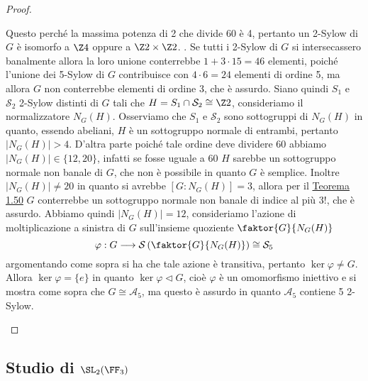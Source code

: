 \documentclass[11pt]{scrartcl}
\begin{document}
\begin{proof}
\begin{itemize}
{				Questo perché la massima potenza di 2 che divide 60 è 4, pertanto
				un 2-Sylow di $G$ è isomorfo a $\Z4$ oppure a $\Z2\times \Z2$.
			}. Se tutti i 2-Sylow di $G$ si intersecassero banalmente allora la 
			loro unione conterrebbe $1 + 3\cdot 15 = 46$ elementi, poiché l'unione dei
			5-Sylow di $G$ contribuisce con $4\cdot 6 = 24$ elementi di ordine 5,
			ma allora $G$ non conterrebbe elementi di ordine 3, che è assurdo.
			Siano quindi $S_1$ e $\mathcal{S}_2$ 2-Sylow distinti di $G$ tali che 
			$H = S_1\cap \mathcal{S}_2 \cong \Z2$, consideriamo il normalizzatore $N_G(H)$.
			Osserviamo che $S_1$ e $\mathcal{S}_2$ sono sottogruppi di $N_G(H)$ in quanto, essendo
			abeliani, $H$ è un sottogruppo normale di entrambi, pertanto $|N_G(H)| > 4$.
			D'altra parte poiché tale ordine deve dividere 60 abbiamo 
			$|N_G(H)| \in \{12, 20\}$, infatti se fosse uguale a 60 $H$ sarebbe un 
			sottogruppo normale non banale di $G$, che non è possibile in quanto $G$
			è semplice. Inoltre $|N_G(H)| \neq 20$ in quanto si avrebbe $[G:N_G(H)] = 3$,
			allora per il \hyperref[teorema1.50]{Teorema 1.50} $G$ conterrebbe
			un sottogruppo normale non banale di indice al più $3!$, che è assurdo.
			Abbiamo quindi $|N_G(H)| = 12$, consideriamo l'azione di 
			moltiplicazione a sinistra di $G$ sull'insieme quoziente $\faktor{G}{N_G(H)}$
			\[
			\varphi : G\longrightarrow\mathcal{S}\left(\faktor{G}{N_G(H)}\right)\cong \mathcal{S}_5
			\]
			argomentando come sopra si ha che tale azione è transitiva, pertanto
			$\ker\varphi \neq G$. Allora $\ker\varphi = \{e\}$ in quanto 
			$\ker\varphi\triangleleft G$, cioè $\varphi$ è un omomorfismo iniettivo
			e si mostra come sopra che $G \cong \mathcal{A}_5$, ma questo è assurdo 
			in quanto $\mathcal{A}_5$ contiene 5 2-Sylow.
		\end{itemize}
	\end{proof}
	
	\newpage
	
	\subsection{Studio di \texorpdfstring{$\SL_2(\FF_3)$}{SL₂(F₃)}}
	
\end{document}
